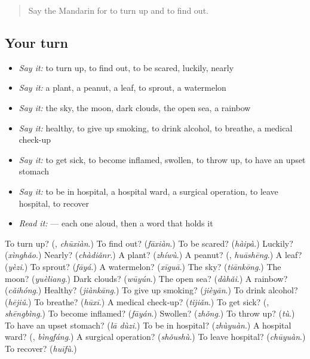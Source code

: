 \label{lesson:ZH-R241-review-236-241}



\begin{quote}
Say the Mandarin for to turn up and to find out.
\end{quote}

\subsection*{Your turn}
\begin{itemize}
\raggedright
  \item \emph{Say it:} to turn up, to find out, to be scared, luckily, nearly
  \item \emph{Say it:} a plant, a peanut, a leaf, to sprout, a watermelon
  \item \emph{Say it:} the sky, the moon, dark clouds, the open sea, a rainbow
  \item \emph{Say it:} healthy, to give up smoking, to drink alcohol, to breathe, a medical check-up
  \item \emph{Say it:} to get sick, to become inflamed, swollen, to throw up, to have an upset stomach
  \item \emph{Say it:} to be in hospital, a hospital ward, a surgical operation, to leave hospital, to recover
  \item \emph{Read it:}  — each one aloud, then a word that holds it
\end{itemize}

\begin{tcolorbox}[breakable,colback=teal!4,colframe=teal!35!black,title={Before you move on}]
To turn up? (\textbf{}, \emph{chūxiàn}.) To find out? (\emph{fāxiàn}.) To be scared? (\emph{hàipà}.) Luckily? (\emph{xìnghǎo}.) Nearly? (\emph{chàdiǎnr}.) A plant? (\emph{zhíwù}.) A peanut? (\textbf{}, \emph{huāshēng}.) A leaf? (\emph{yèzi}.) To sprout? (\emph{fāyá}.) A watermelon? (\emph{xīguā}.) The sky? (\emph{tiānkōng}.) The moon? (\emph{yuèliang}.) Dark clouds? (\emph{wūyún}.) The open sea? (\emph{dàhǎi}.) A rainbow? (\emph{cǎihóng}.) Healthy? (\emph{jiànkāng}.) To give up smoking? (\emph{jièyān}.) To drink alcohol? (\emph{hējiǔ}.) To breathe? (\emph{hūxī}.) A medical check-up? (\emph{tǐjiǎn}.) To get sick? (\textbf{}, \emph{shēngbìng}.) To become inflamed? (\emph{fāyán}.) Swollen? (\emph{zhǒng}.) To throw up? (\emph{tù}.) To have an upset stomach? (\emph{lā dùzi}.) To be in hospital? (\emph{zhùyuàn}.) A hospital ward? (\textbf{}, \emph{bìngfáng}.) A surgical operation? (\emph{shǒushù}.) To leave hospital? (\emph{chūyuàn}.) To recover? (\emph{huīfù}.)
\end{tcolorbox}
